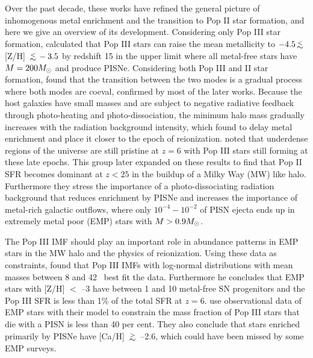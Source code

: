 \documentclass[apjl]{emulateapj}
\begin{document}
Over the past decade, these works have refined the general picture of
inhomogenous metal enrichment and the transition to Pop II star
formation, and here we give an overview of its development.
Considering only Pop III star formation, \citeauthor{Yoshida04}
calculated that Pop III stars can raise the mean metallicity to $-4.5
\lsim$ [Z/H] $\lsim -3.5$ by redshift 15 in the upper limit where all
metal-free stars have $M = 200 \Ms$ and produce PISNe.  Considering
both Pop III and II star formation, \citeauthor{Scannapieco03} found
that the transition between the two modes is a gradual process where
both modes are coeval, confirmed by most of the later works.  Because
the host galaxies have small masses and are subject to negative
radiative feedback through photo-heating and photo-dissociation, the
minimum halo mass gradually increases with the radiation background
intensity, which \citeauthor{Furlanetto05_Reion} found to delay metal
enrichment and place it closer to the epoch of reionization.
\citeauthor{Trenti09} noted that underdense regions of the universe
are still pristine at $z=6$ with Pop III stars still forming at these
late epochs.  This group later expanded on these results to find that
Pop II SFR becomes dominant at $z<25$ in the buildup of a Milky Way
(MW) like halo.  Furthermore they stress the importance of a
photo-dissociating radiation background that reduces enrichment by
PISNe and increases the importance of metal-rich galactic outflows,
where only $10^{-4} - 10^{-2}$ of PISN ejecta ends up in extremely
metal poor (EMP) stars with $M > 0.9 \Ms$.

The Pop III IMF should play an important role in abundance patterns in
EMP stars in the MW halo and the physics of reionization.  Using these
data as constraints, \citeauthor{Tumlinson06} found that Pop III IMFs
with log-normal distributions with mean masses between 8 and 42
\Ms~best fit the data.  Furthermore he concludes that EMP stars with
[Z/H] $<$ --3 have between 1 and 10 metal-free SN progenitors and
the Pop III SFR is less than 1\% of the total SFR at $z=6$.
\citeauthor{Karlsson08} use observational data of EMP stars with
their model to constrain the mass fraction of Pop III stars that
die with a PISN is less than 40 per cent.  They also conclude that
stars enriched primarily by PISNe have [Ca/H] $\gsim$ --2.6, which
could have been missed by some EMP surveys.
\end{document}
